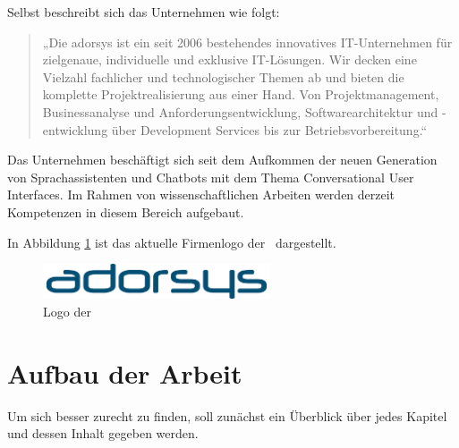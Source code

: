 Selbst beschreibt sich das Unternehmen wie folgt:
\begin{quote}
    „Die adorsys ist ein seit 2006 bestehendes innovatives IT-Unternehmen für zielgenaue, individuelle und exklusive IT-Lösungen. Wir decken eine Vielzahl fachlicher und technologischer Themen ab und bieten die komplette Projektrealisierung aus einer Hand. Von Projektmanagement, Businessanalyse und Anforderungsentwicklung, Softwarearchitektur und -entwicklung über Development Services bis zur Betriebsvorbereitung.“ \cite{adorsys}
\end{quote}

Das Unternehmen beschäftigt sich seit dem Aufkommen der neuen Generation von Sprachassistenten und Chatbots mit dem Thema Conversational User Interfaces. Im Rahmen von wissenschaftlichen Arbeiten werden derzeit Kompetenzen in diesem Bereich aufgebaut.

In Abbildung \ref{fig:logo-adorsys} ist das aktuelle Firmenlogo der \adorsys \, dargestellt.

\begin{figure}[htb]
    \centering
    \includegraphics[width=0.6\textwidth]{bilder/logo.png}
    \caption{Logo der \adorsys \, \cite{adorsys}}
    \label{fig:logo-adorsys}
\end{figure}

\section{Aufbau der Arbeit}
\label{sec:aufbau-der-arbeit}

Um sich besser zurecht zu finden, soll zunächst ein Überblick über jedes Kapitel und dessen Inhalt gegeben werden. 

